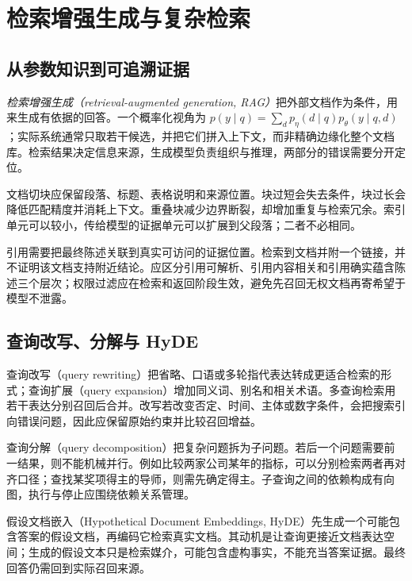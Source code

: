 \setcounter{chapter}{14} %
\chapter{检索增强生成与复杂检索}
\label{ch:rag}

\section{从参数知识到可追溯证据}

\emph{检索增强生成（retrieval-augmented generation, RAG）}把外部文档作为条件，用来生成有依据的回答。一个概率化视角为 $p(y\mid q)=\sum_d p_\eta(d\mid q)p_\theta(y\mid q,d)$；实际系统通常只取若干候选，并把它们拼入上下文，而非精确边缘化整个文档库\cite{rag}。检索结果决定信息来源，生成模型负责组织与推理，两部分的错误需要分开定位。

文档切块应保留段落、标题、表格说明和来源位置。块过短会失去条件，块过长会降低匹配精度并消耗上下文。重叠块减少边界断裂，却增加重复与检索冗余。索引单元可以较小，传给模型的证据单元可以扩展到父段落；二者不必相同。

引用需要把最终陈述关联到真实可访问的证据位置。检索到文档并附一个链接，并不证明该文档支持附近结论。应区分引用可解析、引用内容相关和引用确实蕴含陈述三个层次；权限过滤应在检索和返回阶段生效，避免先召回无权文档再寄希望于模型不泄露。

\section{查询改写、分解与 HyDE}

查询改写（query rewriting）把省略、口语或多轮指代表达转成更适合检索的形式；查询扩展（query expansion）增加同义词、别名和相关术语。多查询检索用若干表达分别召回后合并。改写若改变否定、时间、主体或数字条件，会把搜索引向错误问题，因此应保留原始约束并比较召回增益。

查询分解（query decomposition）把复杂问题拆为子问题。若后一个问题需要前一结果，则不能机械并行。例如比较两家公司某年的指标，可以分别检索两者再对齐口径；查找某奖项得主的导师，则需先确定得主。子查询之间的依赖构成有向图，执行与停止应围绕依赖关系管理。

假设文档嵌入（Hypothetical Document Embeddings, HyDE）先生成一个可能包含答案的假设文档，再编码它检索真实文档\cite{hyde}。其动机是让查询更接近文档表达空间；生成的假设文本只是检索媒介，可能包含虚构事实，不能充当答案证据。最终回答仍需回到实际召回来源。

